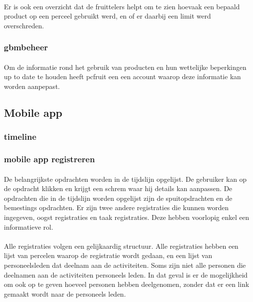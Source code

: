 \paragraph {} Er is ook een overzicht dat de fruittelers helpt om te zien hoevaak een bepaald
product op een perceel gebruikt werd, en of er daarbij een limit werd overschreden.


\subsubsection {gbmbeheer}

\paragraph {} Om de informatie rond het gebruik van producten en hun wettelijke
beperkingen up to date te houden heeft pcfruit een een account waarop deze informatie kan
worden aanpepast.


\subsection {Mobile app}

\subsubsection {timeline}

\subsubsection {mobile app registreren}

\paragraph {} De belangrijkste opdrachten worden in de tijdslijn opgelijst. De gebruiker
kan op de opdracht klikken en krijgt een schrem waar hij details kan aanpassen. De
opdrachten die in de tijdslijn worden opgelijst zijn de spuitopdrachten en de bemestings
opdrachten. Er zijn twee andere registraties die kunnen worden ingegeven, oogst
registraties en taak registraties. Deze hebben voorlopig enkel een informatieve rol.

\paragraph {} Alle registraties volgen een gelijkaardig structuur. Alle registraties
hebben een lijst van percelen waarop de registratie wordt gedaan, en een lijst van
personeelsleden dat deelnam aan de activiteiten. Soms zijn niet alle personen die
deelnamen aan de activiteiten personeels leden. In dat geval is er de mogelijkheid om ook
op te geven hoeveel personen hebben deelgenomen, zonder dat er een link gemaakt wordt naar
de personeels leden.

